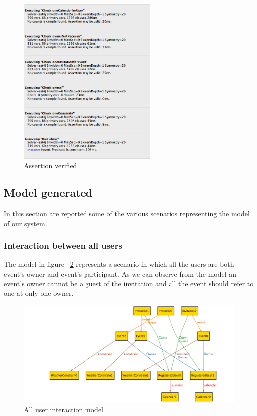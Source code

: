 \begin{center}
 \begin{figure}[H]
    \includegraphics[width=0.6\textwidth]{../Alloy/checkassert.png}
    \caption{Assertion verified}
     \label{fig:asser}
     \end{figure}
   \end{center} 

\subsection{Model generated}
In this section are reported some of the various scenarios representing the model of our system.
\subsubsection{Interaction between all users}
The model in figure ~\ref{fig:allint} represents a scenario in which all the users are both event's owner and event's participant. As we can observe from the model an  event's owner cannot be a guest of the invitation and all the event should refer to one at only one owner.
\begin{center}
 \begin{figure}[H]
    \includegraphics[width=1\textwidth,height=0.5\textwidth]{../Alloy/allInteration.png}
    \caption{All user interaction model}
     \label{fig:allint}
     \end{figure}
   \end{center} 

